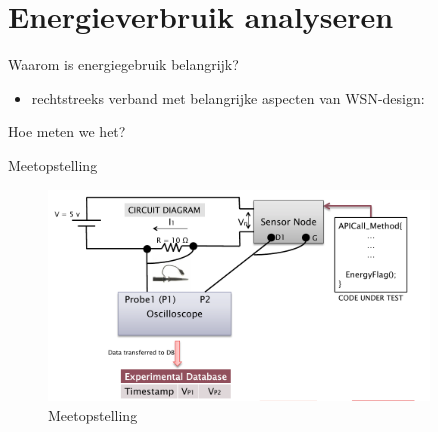 \documentclass[presentation, bigger]{beamer}
\begin{document}
\section{Energieverbruik analyseren}
\label{sec-3}

\begin{frame}[label=sec-3-1]{Waarom is energiegebruik belangrijk?}
\begin{itemize}
\item rechtstreeks verband met belangrijke aspecten van WSN-design:
\end{itemize}
\end{frame}

\begin{frame}[label=sec-3-2]{Hoe meten we het?}
\begin{minipage}{\textwidth}
\centering
{} 
\end{minipage}
\end{frame}

\begin{frame}[label=sec-3-3]{Meetopstelling}
  \begin{figure}[center]
    \centering
    \includegraphics[width=0.9\textwidth,keepaspectration=true]{elek/diag1}
    \caption{Meetopstelling}
  \end{figure}
\end{frame}
\end{document}
